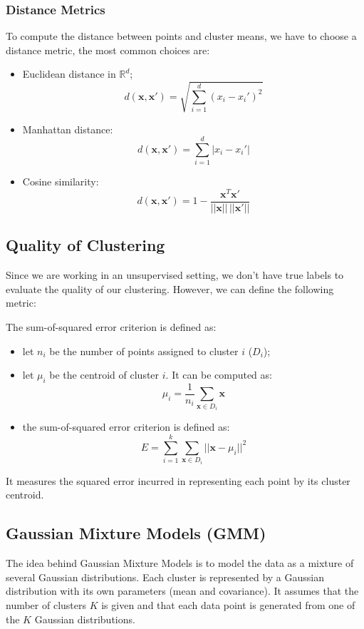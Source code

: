 \subsubsection*{Distance Metrics}
To compute the distance between points and cluster means, we have to choose a distance metric, the most common choices are:
\begin{itemize}
    \item Euclidean distance in $\mathbb{R}^d$;
    \[d(\boldsymbol{x}, \boldsymbol{x}') = \sqrt{\sum_{i=1}^d (x_i - x_i')^2}\]
    \item Manhattan distance:
    \[d(\boldsymbol{x}, \boldsymbol{x}') = \sum_{i=1}^d |x_i - x_i'|\]
    \item Cosine similarity:
    \[d(\boldsymbol{x}, \boldsymbol{x}') = 1 - \frac{\boldsymbol{x}^T  \boldsymbol{x}'}{||\boldsymbol{x}|| \, ||\boldsymbol{x}'||}\]
\end{itemize}
\subsection{Quality of Clustering}
Since we are working in an unsupervised setting, we don't have true labels to evaluate the quality of our clustering. 
However, we can define the following metric:
{
    The sum-of-squared error criterion is defined as:
    \begin{itemize}
        \item let $n_i$ be the number of points assigned to cluster $i$ ($D_i$);
        \item let $\mu_i$ be the centroid of cluster $i$. It can be computed as:
        \[\mu_i = \frac{1}{n_i} \sum_{\boldsymbol{x} \in D_i} \boldsymbol{x}\]
        \item the sum-of-squared error criterion is defined as:
        \[ E = \sum_{i=1}^k \sum_{\boldsymbol{x} \in D_i} ||\boldsymbol{x} - \mu_i||^2 \]
    \end{itemize}
    It measures the squared error incurred in representing each point by its cluster centroid.
}
\subsection{Gaussian Mixture Models (GMM)}
The idea behind Gaussian Mixture Models is to model the data as a mixture of several Gaussian distributions. 
Each cluster is represented by a Gaussian distribution with its own parameters (mean and covariance).
It assumes that the number of clusters $K$ is given and that each data point is generated from one of the $K$ Gaussian distributions.
